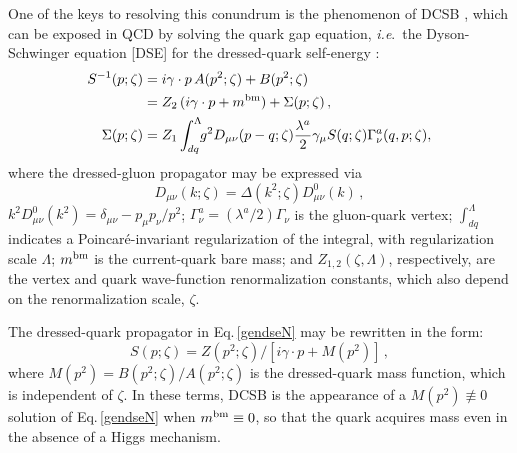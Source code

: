 One of the keys to resolving this conundrum is the phenomenon of DCSB \cite{Nambu:2011zz}, which can be exposed in QCD by solving the quark gap equation, \emph{i.e}.\ the Dyson-Schwinger equation [DSE] for the dressed-quark self-energy \cite{Roberts:1994dr}:
{\allowdisplaybreaks
\begin{subequations}
\label{gendseN}
\begin{align}
S^{-1}(p;\zeta) & = i\gamma\cdot p \, A(p^2;\zeta) + B(p^2;\zeta)\\
%
& = Z_2 \,(i\gamma\cdot p + m^{\rm bm}) + \Sigma(p;\zeta)\,,\\
%
\Sigma(p;\zeta)& =  Z_1 \int^\Lambda_{dq}\!\! g^2 D_{\mu\nu}(p-q;\zeta)\frac{\lambda^a}{2}\gamma_\mu S(q;\zeta) \Gamma^a_\nu(q,p;\zeta) ,
\end{align}
\end{subequations}}
\hspace*{-0.5\parindent}where the dressed-gluon propagator may be expressed via
\begin{equation}
\label{DressedGluon}
 D_{\mu\nu}(k;\zeta) = \Delta(k^2;\zeta) D^0_{\mu\nu}(k) \,,
\end{equation}
$k^2 D^0_{\mu\nu}(k^2)=\delta_{\mu\nu}- p_\mu p_\nu/p^2$;
$\Gamma_\nu^a=(\lambda^a/2) \Gamma_\nu$ is the gluon-quark vertex; $\int^\Lambda_{dq}$ indicates a Poincar\'e-invariant regularization of the integral, with regularization scale $\Lambda$; $m^{\rm bm}$ is the current-quark bare mass; and $Z_{1,2}(\zeta,\Lambda)$, respectively, are the vertex and quark wave-function renormalization constants, which also depend on the renormalization scale, $\zeta$.

The dressed-quark propagator in Eq.\,\eqref{gendseN} may be rewritten in the form:
\begin{equation}
\label{Mpdefinition}
S(p;\zeta) = Z(p^2;\zeta)/[i\gamma\cdot p + M(p^2)]\,,
\end{equation}
where $M(p^2) = B(p^2;\zeta) /A(p^2;\zeta) $ is the dressed-quark mass function, which is independent of $\zeta$.  In these terms, DCSB is the appearance of a $M(p^2) \not\equiv 0$ solution of Eq.\,\eqref{gendseN} when $m^{\rm bm}\equiv 0$, so that the quark acquires mass even in the absence of a Higgs mechanism.

